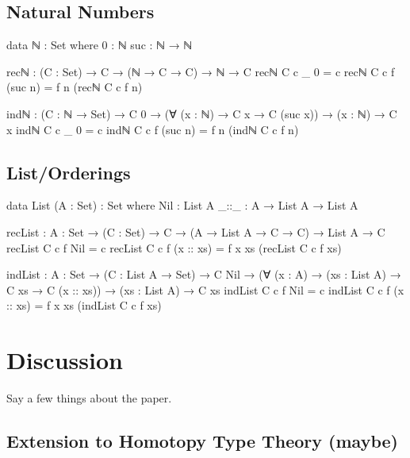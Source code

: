 \documentclass[12pt]{article}
\begin{document}
\subsection*{Natural Numbers}
\begin{center}
\begin{minipage}{0.9\textwidth}
\begin{code}
data ℕ : Set where
  0 : ℕ
  suc : ℕ → ℕ

recℕ : (C : Set) → C → (ℕ → C → C) → ℕ → C
recℕ C c _ 0 = c
recℕ C c f (suc n) = f n (recℕ C c f n) 

indℕ : (C : ℕ → Set) → C 0 →
       (∀ (x : ℕ) → C x → C (suc x)) →
       (x : ℕ) → C x
indℕ C c _ 0 = c
indℕ C c f (suc n) = f n (indℕ C c f n)
\end{code}
\end{minipage}
\end{center}

\subsection*{List/Orderings}
\begin{center}
\begin{minipage}{0.9\textwidth}
\begin{code}
data List (A : Set) : Set where
  Nil  : List A
  _::_ : A → List A → List A

recList : {A : Set} → (C : Set) → C →
          (A → List A → C → C) → List A → C
recList C c f Nil = c
recList C c f (x :: xs) = f x xs (recList C c f xs)

indList : {A : Set} → (C : List A → Set) → C Nil →
          (∀ (x : A) → (xs : List A) → C xs → C (x :: xs)) →
          (xs : List A) → C xs
indList C c f Nil = c
indList C c f (x :: xs) = f x xs (indList C c f xs)
\end{code}
\end{minipage}
\end{center}

\section{Discussion}
Say a few things about the paper.

\subsection*{Extension to Homotopy Type Theory (maybe)}
\end{document}

